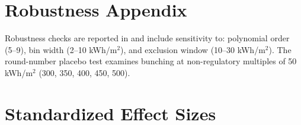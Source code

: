 \documentclass[12pt]{article}
\begin{document}
\section{Robustness Appendix}

Robustness checks are reported in  and include sensitivity to: polynomial order (5--9), bin width (2--10 kWh/m$^2$), and exclusion window (10--30 kWh/m$^2$). The round-number placebo test examines bunching at non-regulatory multiples of 50 kWh/m$^2$ (300, 350, 400, 450, 500).

\section{Standardized Effect Sizes}
\label{sec:sde}


\end{document}
